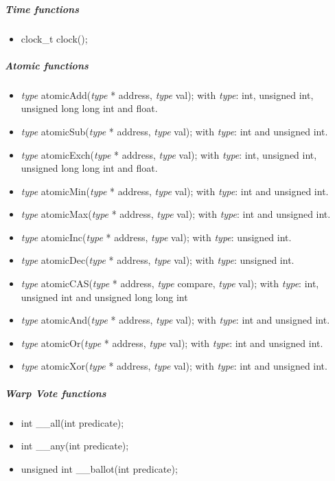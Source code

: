 					\subparagraph{Time functions}

\begin{itemize}
	\item clock\_t clock();
\end{itemize}

					\subparagraph{Atomic functions}

\begin{itemize}
	\item \emph{type} atomicAdd(\emph{type} * address, \emph{type} val); with \emph{type}: int, unsigned int, unsigned long long int and float.
	\item \emph{type} atomicSub(\emph{type} * address, \emph{type} val); with \emph{type}: int and unsigned int.
	\item \emph{type} atomicExch(\emph{type} * address, \emph{type} val); with \emph{type}: int, unsigned int, unsigned long long int and float.
	\item \emph{type} atomicMin(\emph{type} * address, \emph{type} val); with \emph{type}: int and unsigned int.
	\item \emph{type} atomicMax(\emph{type} * address, \emph{type} val); with \emph{type}: int and unsigned int.
	\item \emph{type} atomicInc(\emph{type} * address, \emph{type} val); with \emph{type}: unsigned int.
	\item \emph{type} atomicDec(\emph{type} * address, \emph{type} val); with \emph{type}: unsigned int.
	\item \emph{type} atomicCAS(\emph{type} * address, \emph{type} compare, \emph{type} val); with \emph{type}: int, unsigned int and unsigned long long int
	\item \emph{type} atomicAnd(\emph{type} * address, \emph{type} val); with \emph{type}: int and unsigned int.
	\item \emph{type} atomicOr(\emph{type} * address, \emph{type} val); with \emph{type}: int and unsigned int.
	\item \emph{type} atomicXor(\emph{type} * address, \emph{type} val); with \emph{type}: int and unsigned int.
\end{itemize}

					\subparagraph{Warp Vote functions}

\begin{itemize}
	\item int \_\_all(int predicate);
	\item int \_\_any(int predicate);
	\item unsigned int \_\_ballot(int predicate);
\end{itemize}

